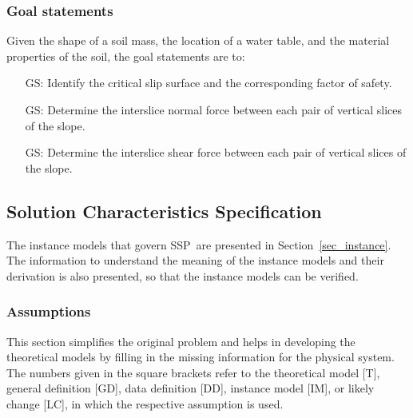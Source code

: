 \documentclass[12pt]{article}
\newcommand{\progname}{SSP}
\newcounter{goalnum} %
\begin{document}
\subsubsection{Goal statements} \label{sec_Goals}

Given the shape of a soil mass, the location of a water table, and the material 
properties of the soil, the goal statements are to:

\begin{itemize}
\item [GS\refstepcounter{goalnum}\thegoalnum: \label{G_Critical}]
  {Identify the critical slip surface and the corresponding factor of safety.}

\item [GS\refstepcounter{goalnum}\thegoalnum: \label{G_Normal}]
  {Determine the interslice normal force between each pair of vertical slices   
  of the slope.}
  
\item [GS\refstepcounter{goalnum}\thegoalnum: \label{G_Shear}]
  {Determine the interslice shear force between each pair of vertical slices of 
  the slope.} 
\end{itemize}

\subsection{Solution Characteristics Specification}

The instance models that govern \progname\ are presented in
Section~\ref{sec_instance}.  The information to understand the
meaning of the instance models and their derivation is also presented,
so that the instance models can be verified.

\subsubsection{Assumptions}
\label{Assumptions}
This section simplifies the original problem and helps in developing the
theoretical models by filling in the missing information for the physical
system. The numbers given in the square brackets refer to the theoretical model
[T], general definition [GD], data definition [DD], instance model [IM], or
likely change [LC], in which the respective assumption is used.
\end{document}
